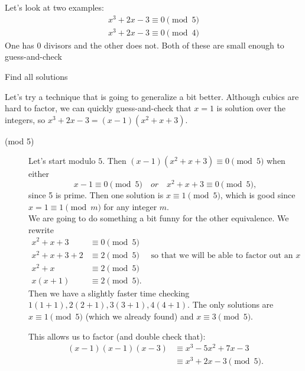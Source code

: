 \documentclass[letterpaper, 11 pt]{article}
\begin{document}
\begin{example}
 Let's look at two examples:
\begin{align*}
 x^3+2x-3\equiv 0 \pmod{5}\\
 x^3+2x-3\equiv 0 \pmod{4}
\end{align*}
One has 0 divisors and the other does not. Both of these are small enough to guess-and-check
\begin{br}[10 minutes]
 Find all solutions 
\end{br}

Let's try a technique that is going to generalize a bit better.
Although cubics are hard to factor, we can quickly guess-and-check that $x=1$ is solution over the integers, so $x^3+2x-3=(x-1)(x^2+x+3)$.
\begin{description}
 \item[(mod 5)] Let's start modulo $5$. Then $(x-1)(x^2+x+3)\equiv 0 \pmod 5$ when either \[x-1\equiv 0 \pmod 5\quad or \quad x^2+x+3\equiv 0\pmod 5,\] since 5 is prime. Then one solution is $x\equiv 1 \pmod 5$, which is good since $x=1\equiv 1 \pmod m$ for any integer $m$. \\
 We are going to do something a bit funny for the other equivalence. We rewrite 
\begin{align*}
x^2+x+3&\equiv 0 \pmod 5\\
 x^2+x+3+2&\equiv 2 \pmod 5 &\textrm{ so that we will be able to factor out an $x$}\\
 x^2+x&\equiv 2 \pmod 5\\
 x(x+1)&\equiv 2 \pmod 5.
\end{align*}
Then we have a slightly faster time checking $1(1+1), 2(2+1), 3(3+1), 4(4+1)$. The only solutions are $x\equiv 1 \pmod5 $ (which we already found) and $x\equiv 3\pmod 5$.

This allows us to factor (and double check that): \begin{align*}
(x-1)(x-1)(x-3)&\equiv x^3-5x^2+7x-3\\&\equiv  x^3+2x-3\pmod 5.
\end{align*}


\end{description}
\end{example}
\end{document}
